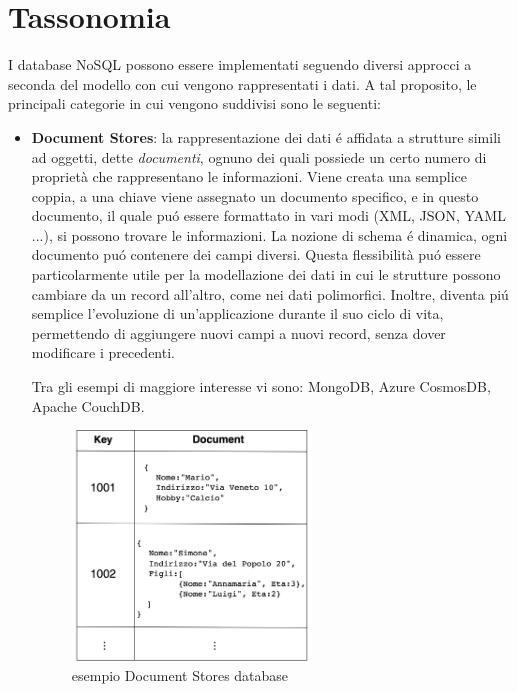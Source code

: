 \section{Tassonomia}
I database NoSQL possono essere implementati seguendo diversi approcci a seconda del modello con cui vengono
rappresentati i dati.
A tal proposito, le principali categorie in cui vengono suddivisi sono le seguenti:
\begin{itemize}
    \item \textbf{Document Stores}: la rappresentazione dei dati é affidata a strutture simili ad oggetti, dette \emph{documenti}, ognuno dei
    quali possiede un certo numero di proprietà che rappresentano le informazioni.
    Viene creata una semplice coppia, a una chiave viene assegnato un documento specifico, e in questo documento, il quale puó essere
    formattato in vari modi (XML, JSON, YAML ...), si possono trovare le informazioni.
    La nozione di schema é dinamica, ogni documento puó contenere dei campi diversi.
    Questa flessibilità puó essere particolarmente
    utile per la modellazione dei dati in cui le strutture possono cambiare da un record all'altro, come nei dati polimorfici.
    Inoltre, diventa piú semplice l'evoluzione di un'applicazione durante il suo ciclo di vita, permettendo di aggiungere
    nuovi campi a nuovi record, senza dover modificare i precedenti.

    Tra gli esempi di maggiore interesse vi sono: MongoDB, Azure CosmosDB, Apache CouchDB.
    \begin{figure}[H]
        \begin{center}
            \includegraphics[width=0.6\textwidth]{img/dbDocumentale}
        \end{center}
        \caption{esempio Document Stores database}
    \end{figure}


\end{itemize}
